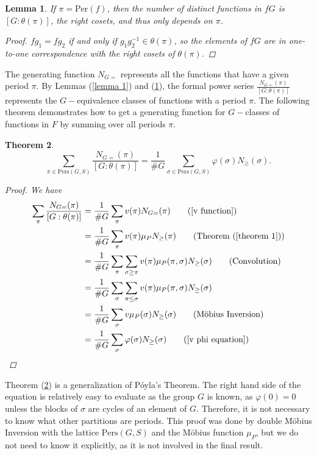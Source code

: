 \documentclass[psamsfonts]{amsart}
\newtheorem{thm}{Theorem}[section]
\newtheorem{lem}[thm]{Lemma}
\theoremstyle{definition}
\theoremstyle{remark}
\numberwithin{equation}{section}
\begin{document}
\begin{lem}\label{lemma 2}
If $\pi=\text{Per}(f)$, then the number of distinct functions in $fG$ is $[G:\theta(\pi)]$, the right cosets, and thus only depends on $\pi$.
\begin{proof}
    $fg_1=fg_2$ if and only if $g_1g_2^{-1}\in \theta(\pi)$, so the elements of $fG$ are in one-to-one correspondence with the right cosets of $\theta(\pi)$. 
\end{proof}
\end{lem}
The generating function $N_{G=}$ represents all the functions that have a given period $\pi$. By Lemmas (\ref{lemma 1}) and (\ref{lemma 2}), the formal power series $\frac{N_{G=}(\pi)}{[G:\theta(\pi)]}$ represents the $G-$equivalence classes of functions with a period $\pi$. The following theorem demonstrates how to get a generating function for $G-$classes of functions in $F$ by summing over all periods $\pi$. 
\begin{thm}\label{theorem 2}
\begin{equation}
\sum_{\pi\in \text{Pers}(G,S)} \frac{N_{G=}(\pi)}{[G:\theta(\pi)]} = \frac{1}{\#G}\sum_{\sigma\in \text{Pers}(G,S)}\varphi(\sigma)N_{\geq}(\sigma).
\end{equation}
\begin{proof}
We have
\begin{equation*} 
\begin{split}
\sum_{\pi}\frac{N_{G=}(\pi)}{[G:\theta(\pi)]} & = \frac{1}{\#G}\sum_{\pi}v(\pi)N_{G=}(\pi)  \text{\qquad(\ref{v function})} \\
 & = \frac{1}{\#G}\sum_{\pi} v(\pi)\mu_{P}N_{\geq}(\pi) \text{\qquad(Theorem (\ref{theorem 1}))}\\
 & = \frac{1}{\#G}\sum_{\pi}\sum_{\sigma\geq \pi} v(\pi)\mu_{P}(\pi,\sigma)N_{\geq}(\sigma) \text{\qquad(Convolution)} \\
 & = \frac{1}{\#G}\sum_{\sigma}\sum_{\pi\leq \sigma} v(\pi)\mu_{P}(\pi,\sigma)N_{\geq}(\sigma) \\
 & = \frac{1}{\#G}\sum_{\sigma}v\mu_P(\sigma)N_{\geq}(\sigma) \text{\qquad(M\"{o}bius Inversion)}\\
 & = \frac{1}{\#G}\sum_{\sigma}\varphi(\sigma)N_{\geq}(\sigma) \text{\qquad (\ref{v phi equation})}
\end{split}
\end{equation*}
\end{proof}
\end{thm}
Theorem (\ref{theorem 2}) is a generalization of P\'{o}yla's Theorem. The right hand side of the equation is relatively easy to evaluate as the group $G$ is known, as $\varphi(0)=0$ unless the blocks of $\sigma$ are cycles of an element of $G$. Therefore, it is not necessary to know what other partitions are periods. This proof was done by double M\"{o}bius Inversion with the lattice $\text{Pers}(G,S)$ and the M\"{o}bius function $\mu_P$, but we do not need to know it explicitly, as it is not involved in the final result.\\
\end{document}
